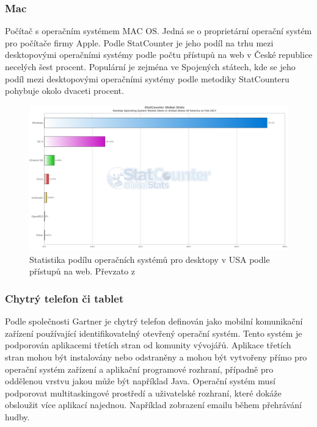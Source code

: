  
 
 \subsubsection{Mac}
 Počítač s operačním systémem MAC OS. Jedná se o proprietární operační systém pro počítače firmy Apple. Podle StatCounter je jeho podíl na trhu mezi desktopovými operačními systémy podle počtu přístupů na web v České republice necelých šest procent. Populární je zejména ve Spojených státech, kde se jeho podíl mezi desktopovými operačními systémy podle metodiky StatCounteru pohybuje okolo dvaceti procent.
 
 \begin{figure}[h]
\includegraphics[width=13cm]{img/StatCounter_Destop_USA}
\caption{Statistika podílu operačních systémů pro desktopy v USA podle přístupů na web. Převzato z \cite{http://gs.statcounter.com/os-market-share/mobile-tablet/czech-republic/}} 
\centering
\end{figure}
 
 
 \subsubsection{Chytrý telefon či tablet}
 Podle společnosti Gartner  je chytrý telefon definován jako mobilní komunikační zařízení používající identifikovatelný otevřený operační systém. Tento systém je podporován aplikacemi třetích stran od komunity vývojářů. Aplikace třetích stran mohou být instalovány nebo odstraněny a mohou být vytvořeny přímo pro operační systém zařízení a aplikační programové rozhraní, případně pro oddělenou vrstvu jakou může být například Java. Operační systém musí podporovat multitaskingové prostředí a uživatelské rozhraní, které dokáže obsloužit více aplikací najednou. Například zobrazení emailu během přehrávání hudby.
 
